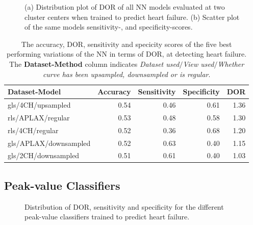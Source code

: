 \begin{figure}[htb]
    \centering
    
    \caption{(a) Distribution plot of DOR of all NN models evaluated at two cluster centers when trained to predict heart failure.
             (b) Scatter plot of the same models sensitivity-, and specificity-scores.}
    \label{fig:dl_hf_dor_sens_spec_dist}
\end{figure}

\begin{table}
    \centering
    \begin{tabular}{lrrrr}
        \toprule
        Dataset-Model         &  Accuracy &  Sensitivity &  Specificity &  DOR \\
        \midrule
        gls/4CH/upsampled     &      0.54 &         0.46 &         0.61 & 1.36 \\
        rls/APLAX/regular     &      0.53 &         0.48 &         0.58 & 1.30 \\
        rls/4CH/regular       &      0.52 &         0.36 &         0.68 & 1.20 \\
        gls/APLAX/downsampled &      0.52 &         0.63 &         0.40 & 1.15 \\
        gls/2CH/downsampled   &      0.51 &         0.61 &         0.40 & 1.03 \\
        \bottomrule
    \end{tabular}
    \caption{The accuracy, DOR, sensitivity and specicity scores of the five best performing variations of the NN in terms of DOR, at detecting heart failure.
             The \textbf{Dataset-Method} column indicates \textit{Dataset used}$/$\textit{View used}$/$\textit{Whether curve has been upsampled, downsampled or is regular}.}
    \label{tab:dl_hf_dor_sens_spec_dist}
\end{table}

\newpage

\subsection{Peak-value Classifiers}

\begin{figure}[htb]
    \centering
    
    \caption{Distribution of DOR, sensitivity and specificity for the different peak-value classifiers trained to predict heart failure.}
    \label{fig:pvmlc_hf_dor_sens_spec_dis}
\end{figure}

